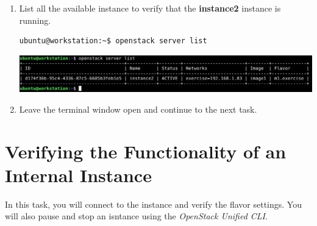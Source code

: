 \documentclass[letterpaper, 12pt]{article}
\begin{document}
\begin{enumerate}
    \item List all the available instance to verify that the \textbf{instance2} instance is running.
\begin{lstlisting}
ubuntu@workstation:~$ openstack server list
\end{lstlisting}

    \begin{center}
        \includegraphics[width=\linewidth]{images/part4/step13.png}
    \end{center}

    \item Leave the terminal window open and continue to the next task.

\end{enumerate}

\section{Verifying the Functionality of an Internal Instance}
\label{sec:verifying_the_functionality_of_an_internal_instance}
In this task, you will connect to the instance and verify the flavor settings. You will also pause and stop an isntance
using the \textit{OpenStack Unified CLI}.
\end{document}
